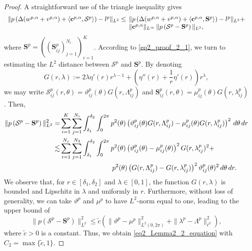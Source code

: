 \documentclass[oneside]{article}
\begin{document}
\begin{proof}
A straightforward use of the triangle inequality gives 
\begin{equation}\label{eq2_proof_2_1}
\begin{array}{rl}
\|p\left(\Delta  (w^{p, \alpha} + v^{p, \alpha})+ \langle \mathbf{c}^{p, \alpha}, \mathcal{S}^p\rangle\right)-l^p\|_{L^2}\leq &\hspace{-2mm}  \|p\left(\Delta  (w^{p, \alpha} + v^{p, \alpha}) +\langle \mathbf{c}^{p, \alpha}, \mathbf{S}^p\rangle\right)-l^p\|_{L^2}+\\
& \hspace{-2mm}\|\mathbf{c}^{p, \alpha}\|_{L^\infty}\,\|p\left(\mathcal{S}^p-\mathbf{S}^p\right)\|_{L^2},
\end{array}
\end{equation}
where \(\mathbf{S}^p = \left( \left( \mathbf{S}^p_{ij} \right)_{j=1}^{N_i} \right)_{i=1}^K\). 
According to \eqref{eq2_proof_2_1}, we turn to estimating the $L^2$ distance between $\mathcal{S}^p$ and $\mathbf{S}^p$. 
By denoting 
$$
G(r, \lambda) := 
2\lambda \eta'(r) r^{\lambda-1}
+ \left( \eta''(r) + \frac{1}{r} \eta'(r) \right) r^{\lambda}, 
$$
we may write $\mathcal{S}^p_{ij}(r,\theta)=\vartheta_{ij}^p(\theta)G(r,\Lambda_{ij}^p)$ and $\mathbf{S}^p_{ij}(r,\theta)=\mu_{ij}^p(\theta)G(r,\lambda_{ij}^p)$. Then,
\begin{equation}
\begin{split}
\|p\left(\mathcal{S}^p-\mathbf{S}^p\right)\|_{L^2}^2 = & \sum_{i = 1}^K\sum_{j=1}^{N_i}\int_{\delta_1}^{\delta_2}\int_0^{2\pi} p^2(\theta)\left(\vartheta^p_{ij}(\theta)G(r,\Lambda^p_{ij})-\mu^p_{ij}(\theta)G(r,\lambda^p_{ij})\right)^2\,d\theta\,dr\\
\lesssim  &\sum_{i = 1}^{N_s}\sum_{j=1}^{N_3}\int_{\delta_1}^{\delta_2}\int_0^{2\pi} p^2(\theta)\left(\vartheta^p_{ij}(\theta)-\mu^p_{ij}(\theta)\right)^2G(r,\lambda^p_{ij})^2+\\
&\hspace{2.7cm} p^2(\theta)\left(G(r,\Lambda^p_{ij})-G(r,\lambda^p_{ij})\right)^2\vartheta^p_{ij}(\theta)^2\,d\theta\,dr.\\
\end{split}
\end{equation}
We observe that, for $r \in [\delta_1,\delta_2]$ and $\lambda \in [0,1]$, 
the function $G(r,\lambda)$ is bounded and Lipschitz in $\lambda$ and 
uniformly in $r$. Furthermore, without loss of generality, we can take $\vartheta^p$ and $\mu^p$ to have $L^2$-norm equal to one, leading to the upper bound of 
$$
\|p\left(\mathcal{S}^p-\mathbf{S}^p\right)\|_{L^2}^2 \leq \tilde{c}\left(
\| \vartheta^p - \mu^p \|^2_{L^2(0, 2\pi)}
+ \| \lambda^p - \Lambda^p \|^2_{\ell^2}
\right),
$$
where $\tilde{c}>0$ is a constant. Thus, we obtain \eqref{eq2_Lemma2_2_equation} with $C_2 = \max \{\tilde{c},  1 \}$.
\end{proof}
\end{document}
